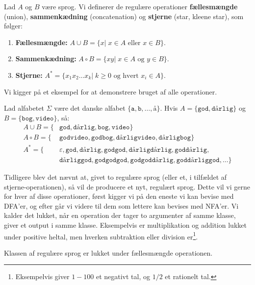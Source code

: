 \begin{definition}
  Lad $A$ og $B$ være sprog. Vi definerer de regulære operationer \textbf{fællesmængde} (union), \textbf{sammenkædning} (concatenation) og \textbf{stjerne} (star, kleene star), som følger:
  \begin{enumerate}
    \item \textbf{Fællesmængde:} $A \cup B = \{x |\; x \in A \text{ eller } x \in B \}$.
    \item \textbf{Sammenkædning:} $A \circ B = \{xy |\; x \in A \text{ og } y \in B\}$.
          \item \textbf{Stjerne:} $A^{*} = \{x_{1}x_{2}\ldots x_{k} |\; k \geq 0 \text{ og hvert } x_{i} \in A\}$.
  \end{enumerate}
\end{definition}

Vi kigger på et eksempel for at demonstrere bruget af alle operationer.

\begin{example}
  Lad alfabetet $\Sigma$ være det danske alfabet $\{\mathtt{a, b, \ldots, å}\}$. Hvis $A = \{\mathtt{god, dårlig}\}$ og $B = \{\mathtt{bog, video}\}$, så:
\begin{equation*}
\begin{split}
  A \cup B = \{&\mathtt{god, dårlig, bog, video}\}\\
  A \circ B = \{&\mathtt{godvideo, godbog, dårligvideo, dårligbog}\}\\
  A^{*} = \{&\varepsilon, \mathtt{god, dårlig, godgod, dårligdårlig, goddårlig,}\\
  &\mathtt{dårliggod, godgodgod, godgoddårlig, goddårliggod, \ldots}\}
\end{split}
\end{equation*}
\end{example}

Tidligere blev det nævnt at, givet to regulære sprog (eller et, i tilfældet af stjerne-operationen), så vil de producere et nyt, regulært sprog. Dette vil vi gerne for hver af disse operationer, først kigger vi på den eneste vi kan bevise med DFA'er, og efter går vi videre til dem som lettere kan bevises med NFA'er. Vi kalder det lukket, når en operation der tager to argumenter af samme klasse, giver et output i samme klasse. Eksempelvis er multiplikation og addition lukket under positive heltal, men hverken subtraktion eller division er\footnote{Eksempelvis giver $1-100$ et negativt tal, og $1/2$ et rationelt tal.}.

\begin{theorem}
Klassen af regulære sprog er lukket under fællesmængde operationen.
\end{theorem}

